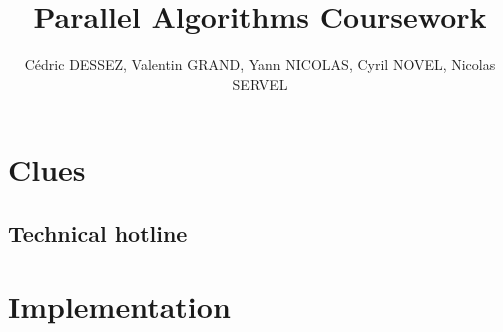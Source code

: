 \documentclass[11pt,a4paper]{article}
\begin{document}
\title{Parallel Algorithms Coursework}
\author{C\'edric DESSEZ, Valentin GRAND, Yann NICOLAS, Cyril NOVEL, Nicolas SERVEL}
\maketitle

\section{Clues}
\subsection{Technical hotline}

\section{Implementation}
\end{document}
